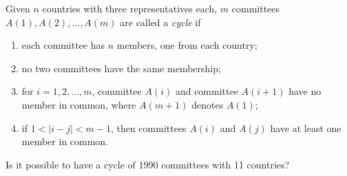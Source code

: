 Given $n$ countries with three representatives each, $m$ committees $A(1), A(2), \ldots, A(m)$ are called a \emph{cycle} if
\begin{enumerate}
\item[(i)] each committee has $n$ members, one from each country;
\item[(ii)] no two committees have the same membership;
\item[(iii)] for $i = 1, 2, \ldots, m$, committee $A(i)$ and committee $A(i+1)$ have no member in common, where $A(m+1)$ denotes $A(1)$;
\item[(iv)] if $1 < |i - j| < m - 1$, then committees $A(i)$ and $A(j)$ have at least one member in common.
\end{enumerate}
Is it possible to have a cycle of 1990 committees with 11 countries?
